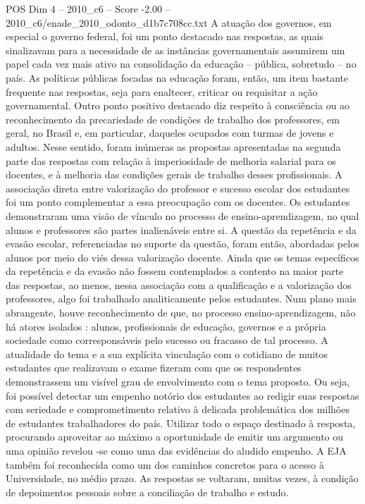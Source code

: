 \begin{textsample}{POS Dim 4 – 2010\_c6 – Score -2.00 – 2010\_c6/enade\_2010\_odonto\_d1b7c708cc.txt}
A atuação dos governos, em especial o governo federal, foi um ponto destacado nas respostas, as quais sinalizavam para a necessidade de as instâncias governamentais assumirem um papel cada vez mais ativo na consolidação da educação – pública, sobretudo – no país.
As políticas públicas focadas na educação foram, então, um item bastante frequente nas respostas, seja para enaltecer, criticar ou requisitar a ação governamental.
Outro ponto positivo destacado diz respeito à consciência ou ao reconhecimento da precariedade de condições de trabalho dos professores, em geral, no Brasil e, em particular, daqueles ocupados com turmas de jovens e adultos.
Nesse sentido, foram inúmeras as propostas apresentadas na segunda parte das respostas com relação à imperiosidade de melhoria salarial para os docentes, e à melhoria das condições gerais de trabalho desses profissionais.
A associação direta entre valorização do professor e sucesso escolar dos estudantes foi um ponto complementar a essa preocupação com os docentes.
Os estudantes demonstraram uma visão de vínculo no processo de ensino-aprendizagem, no qual alunos e professores são partes inalienáveis entre si.
A questão da repetência e da evasão escolar, referenciadas no suporte da questão, foram então, abordadas pelos alunos por meio do viés dessa valorização docente.
Ainda que os temas específicos da repetência e da evasão não fossem contemplados a contento na maior parte das respostas, ao menos, nessa associação com a qualificação e a valorização dos professores, algo foi trabalhado analiticamente pelos estudantes.
Num plano mais abrangente, houve reconhecimento de que, no processo ensino-aprendizagem, não há atores isolados : alunos, profissionais de educação, governos e a própria sociedade como corresponsáveis pelo sucesso ou fracasso de tal processo.
A atualidade do tema e a sua explícita vinculação com o cotidiano de muitos estudantes que realizavam o exame fizeram com que os respondentes demonstrassem um visível grau de envolvimento com o tema proposto.
Ou seja, foi possível detectar um empenho notório dos estudantes ao redigir suas respostas com seriedade e comprometimento relativo à delicada problemática dos milhões de estudantes trabalhadores do país.
Utilizar todo o espaço destinado à resposta, procurando aproveitar ao máximo a oportunidade de emitir um argumento ou uma opinião revelou -se como uma das evidências do aludido empenho.
A EJA também foi reconhecida como um dos caminhos concretos para o acesso à Universidade, no médio prazo.
As respostas se voltaram, muitas vezes, à condição de depoimentos pessoais sobre a conciliação de trabalho e estudo.

\end{textsample}
